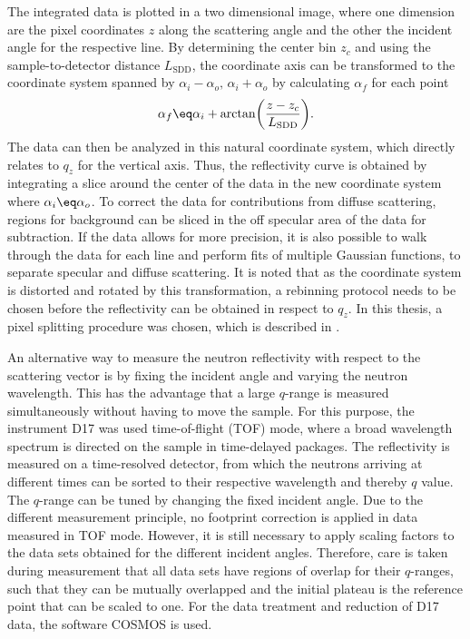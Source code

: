 \documentclass[\main/dresen_thesis.tex]{subfiles}
\begin{document}
    The integrated data is plotted in a two dimensional image, where one dimension are the pixel coordinates $z$ along the scattering angle and the other the incident angle for the respective line.
    By determining the center bin $z_c$ and using the sample-to-detector distance $L_\mathrm{SDD}$, the coordinate axis can be transformed to the coordinate system spanned by $\alpha_i - \alpha_o,\,\alpha_i+\alpha_o$ by calculating $\alpha_f$ for each point
    \begin{align}
      \alpha_f \eq \alpha_i + \arctan\biggl( \frac{z-z_c}{L_\mathrm{SDD}}\biggr).
    \end{align}
    The data can then be analyzed in this natural coordinate system, which directly relates to $q_z$ for the vertical axis.
    Thus, the reflectivity curve is obtained by integrating a slice around the center of the data in the new coordinate system where $\alpha_i \eq \alpha_o$.
    To correct the data for contributions from diffuse scattering, regions for background can be sliced in the off specular area of the data for subtraction.
    If the data allows for more precision, it is also possible to walk through the data for each line and perform fits of multiple Gaussian functions, to separate specular and diffuse scattering.
    It is noted that as the coordinate system is distorted and rotated by this transformation, a rebinning protocol needs to be chosen before the reflectivity can be obtained in respect to $q_z$.
    In this thesis, a pixel splitting procedure was chosen, which is described in .

    An alternative way to measure the neutron reflectivity with respect to the scattering vector is by fixing the incident angle and varying the neutron wavelength.
    This has the advantage that a large $q$-range is measured simultaneously without having to move the sample.
    For this purpose, the instrument D17 was used time-of-flight (TOF) mode, where a broad wavelength spectrum is directed on the sample in time-delayed packages.
    The reflectivity is measured on a time-resolved detector, from which the neutrons arriving at different times can be sorted to their respective wavelength and thereby $q$ value.
    The $q$-range can be tuned by changing the fixed incident angle.
    Due to the different measurement principle, no footprint correction is applied in data measured in TOF mode.
    However, it is still necessary to apply scaling factors to the data sets obtained for the different incident angles.
    Therefore, care is taken during measurement that all data sets have regions of overlap for their $q$-ranges, such that they can be mutually overlapped and the initial plateau is the reference point that can be scaled to one.
    For the data treatment and reduction of D17 data, the software COSMOS \cite{Gutfreund_2018_Towar} is used.
\end{document}
